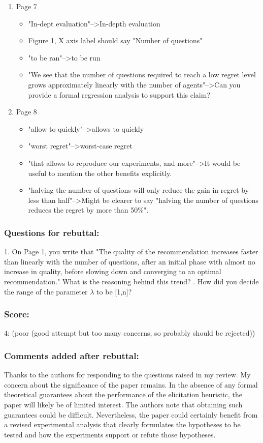 \documentclass[version=3.21, pagesize, twoside=off, bibliography=totoc, DIV=calc, fontsize=12pt, a4paper]{scrartcl}
\begin{document}
\begin{enumerate}
\item Page 7 
\begin{itemize}
	\item "In-dept evaluation"-->In-depth evaluation
	\item Figure 1, X axis label should say "Number of questions"
	\item "to be ran"-->to be run
	\item "We see that the number of questions required to reach a low regret level grows approximately linearly with the number of agents"-->Can you provide a formal regression analysis to support this claim?
\end{itemize}

\item Page 8 
\begin{itemize}
	\item "allow to quickly"-->allows to quickly
	\item "worst regret"-->worst-case regret
	\item "that allows to reproduce our experiments, and more"-->It would be useful to mention the other benefits explicitly.
	\item "halving the number of questions will only reduce the gain in regret by less than half"-->Might be clearer to say "halving the number of questions reduces the regret by more than 50$\%$".
\end{itemize}

\end{enumerate}
\subsubsection*{Questions for rebuttal:}	1. On Page 1, you write that "The quality of the recommendation increases faster than linearly with the number of questions, after an initial phase with almost no increase in quality, before slowing down and converging to an optimal recommendation." What is the reasoning behind this trend?
. How did you decide the range of the parameter $\lambda$ to be [1,n]?
\subsubsection*{Score:}	
4: (poor (good attempt but too many concerns, so probably should be rejected))

\subsubsection*{Comments added after rebuttal:}
Thanks to the authors for responding to the questions raised in my review. My concern about the significance of the paper remains. In the absence of any formal theoretical guarantees about the performance of the elicitation heuristic, the paper will likely be of limited interest. The authors note that obtaining such guarantees could be difficult. Nevertheless, the paper could certainly benefit from a revised experimental analysis that clearly formulates the hypotheses to be tested and how the experiments support or refute those hypotheses.
\end{document}

